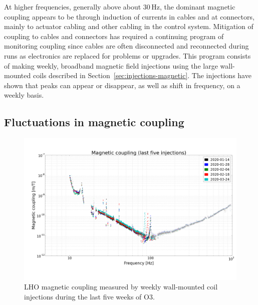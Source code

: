 At higher frequencies, generally above about 30\,Hz, the dominant magnetic coupling appears to be through induction of currents in cables and at connectors, mainly to actuator cabling and other cabling in the control system.
Mitigation of coupling to cables and connectors has required a continuing program of monitoring coupling since cables are often disconnected and reconnected during runs as electronics are replaced for problems or upgrades.
This program consists of making weekly, broadband magnetic field injections using the large wall-mounted coils described in Section~\ref{sec:injections-magnetic}.
The injections have shown that peaks can appear or disappear, as well as shift in frequency, on a weekly basis.

\subsection{Fluctuations in magnetic coupling}\label{sec:mag-weekly}

\begin{figure}[h]
	\centering
	\includegraphics[width=\textwidth]{figures/noise-studies/mag-weekly-cf.png}
	\caption{
		LHO magnetic coupling measured by weekly wall-mounted coil injections during the last five weeks of O3.}
	\label{fig:mag-weekly-cf}
\end{figure}

